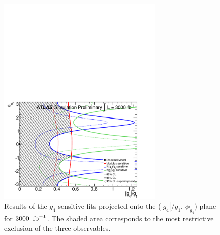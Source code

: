 \begin{figure}[!htbp]
\centering
\includegraphics[width=0.70\textwidth]{section2/plots/hzz/ATL-PHYS-PUB-2013-013_fig_05d.pdf}
\caption
{
Results of the $g_4$-sensitive fits projected onto the ($|g_4|/g_1$, $\phi_{g_4}$) plane for $3000~\mbox{\ensuremath{\,\text{fb}^\text{$-$1}}}$. The shaded area corresponds to the most restrictive exclusion of the three observables. 
}
\label{fig:fgi-atlas-HZZ_anom_couplings}
\end{figure}
